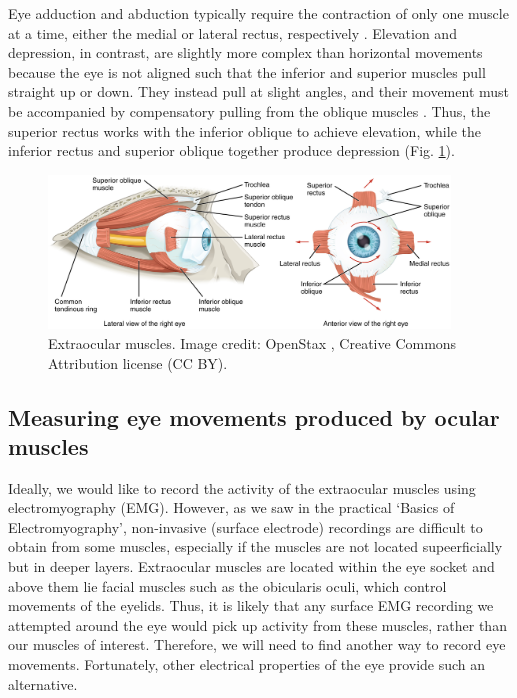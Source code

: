 \documentclass[12pt]{article}
\begin{document}
\vspace{0.3cm}

Eye adduction and abduction typically require the contraction of only one muscle at a time, either the medial or lateral rectus, respectively \cite{purves2001editors}. Elevation and depression, in contrast, are slightly more complex than horizontal movements because the eye is not aligned such that the inferior and superior muscles pull straight up or down. They instead pull at slight angles, and their movement must be accompanied by compensatory pulling from the oblique muscles \cite{openStax2017sensory}. Thus, the superior rectus works with the inferior oblique to achieve elevation, while the inferior rectus and superior oblique together produce depression \cite{purves2001editors} (Fig. \ref{fig:eyeMuscles}). 

\begin{figure}[h!]
\centering
\includegraphics[width=0.95\textwidth]{images/extraocularMuscles.jpg}
\caption{Extraocular muscles. Image credit: OpenStax \cite{openStax2017sensory}, Creative Commons Attribution license (CC BY).}
\label{fig:eyeMuscles}
\end{figure}

\subsection*{Measuring eye movements produced by ocular muscles}

Ideally, we would like to record the activity of the extraocular muscles using electromyography (EMG). However, as we saw in the practical `Basics of Electromyography', non-invasive (surface electrode) recordings are difficult to obtain from some muscles, especially if the muscles are not located supeerficially but in deeper layers. Extraocular muscles are located 
within the eye socket and above them lie facial muscles such as the obicularis oculi, which control movements of the eyelids. Thus, it is likely that any surface EMG recording we attempted around the eye would pick up activity from these muscles, rather than our muscles of interest. Therefore, we will need to find another way to record eye movements. Fortunately, other electrical properties of the eye provide such an alternative. 
\end{document}
